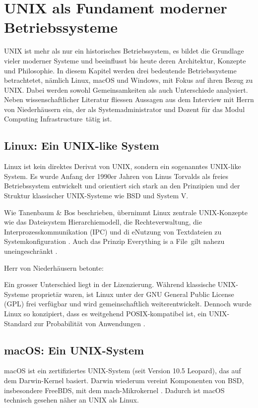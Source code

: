 \section{UNIX als Fundament moderner Betriebssysteme}

UNIX ist mehr als nur ein historisches Betriebssystem, es bildet die Grundlage vieler moderner Systeme und beeinflusst bis heute deren Architektur, Konzepte und
Philosophie. In diesem Kapitel werden drei bedeutende Betriebssysteme betrachtetet, nämlich Linux, macOS und Windows, mit Fokus auf ihren Bezug zu UNIX.
Dabei werden sowohl Gemeinsamkeiten als auch Unterschiede analysiert. Neben wissenschaftlicher Literatur fliessen Aussagen aus dem Interview mit Herrn
von Niederhäusern ein, der als Systemadministrator und Dozent für das Modul \glqq Computing Infrastructure\grqq \ tätig ist.


\subsection{Linux: Ein UNIX-like System}

Linux ist kein direktes Derivat von UNIX, sondern ein sogenanntes UNIX-like System. Es wurde Anfang der 1990er Jahren von Linus Torvalds als freies Betriebssystem
entwickelt und orientiert sich stark an den Prinzipien und der Struktur klassischer UNIX-Systeme wie BSD und System V. \cite{ModernOS}

Wie Tanenbaum \& Bos beschrieben, übernimmt Linux zentrale UNIX-Konzepte wie das Dateisystem Hierarchiemodell, die Rechteverwaltung, die Interprozesskommunikation
(IPC) und di eNutzung von Textdateien zu Systemkonfiguration \cite{ModernOS}. Auch das Prinzip \glqq Everything is a File\grqq \ gilt nahezu uneingeschränkt
\cite{ArtOfUnixProgramming}.

Herr von Niederhäusern betonte: %

Ein grosser Unterschied liegt in der Lizenzierung. Während klassische UNIX-Systeme proprietär waren, ist Linux unter der GNU General Public License (GPL)
frei verfügbar und wird gemeinschaftlich weiterentwickelt. Dennoch wurde Linux so konzipiert, dass es weitgehend POSIX-kompatibel ist, ein UNIX-Standard zur
Probabilität von Anwendungen \cite{OSConcept}.


\subsection{macOS: Ein UNIX-System}

macOS ist ein zertifiziertes UNIX-System (seit Version 10.5 \glqq Leopard\grqq), das auf dem Darwin-Kernel basiert. Darwin wiederum vereint Komponenten von BSD,
insbesondere FreeBDS, mit dem mach-Mikrokernel \cite{FreeBSDOS}. Dadurch ist macOS technisch gesehen näher an UNIX als Linux.

